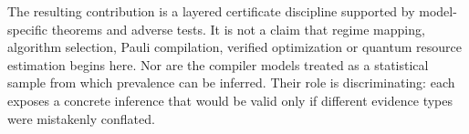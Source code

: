 The resulting contribution is a layered certificate discipline supported by model-specific theorems and adverse tests.  It is not a claim that regime mapping, algorithm selection, Pauli compilation, verified optimization or quantum resource estimation begins here.  Nor are the compiler models treated as a statistical sample from which prevalence can be inferred.  Their role is discriminating: each exposes a concrete inference that would be valid only if different evidence types were mistakenly conflated.
